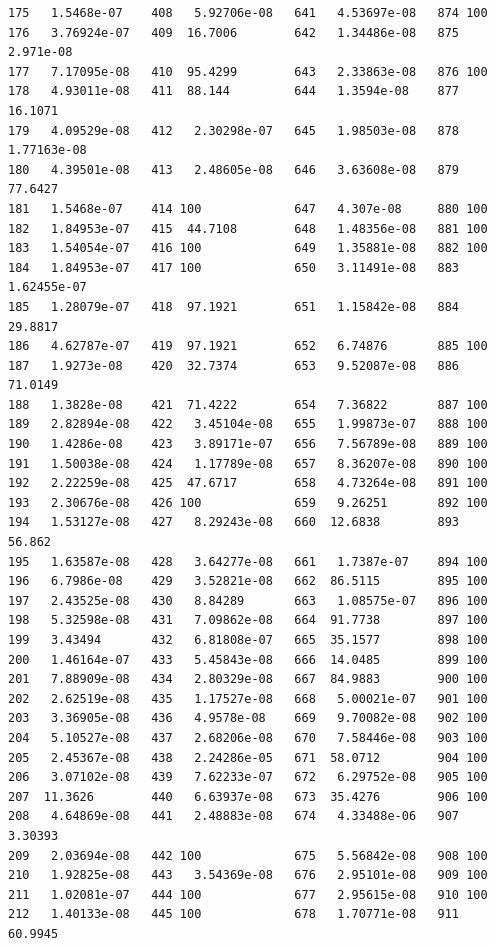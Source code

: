 \documentclass{article}
\begin{document}
\begin{verbatim}
175   1.5468e-07    408   5.92706e-08   641   4.53697e-08   874 100
176   3.76924e-07   409  16.7006        642   1.34486e-08   875   2.971e-08
177   7.17095e-08   410  95.4299        643   2.33863e-08   876 100
178   4.93011e-08   411  88.144         644   1.3594e-08    877  16.1071
179   4.09529e-08   412   2.30298e-07   645   1.98503e-08   878   1.77163e-08
180   4.39501e-08   413   2.48605e-08   646   3.63608e-08   879  77.6427
181   1.5468e-07    414 100             647   4.307e-08     880 100
182   1.84953e-07   415  44.7108        648   1.48356e-08   881 100
183   1.54054e-07   416 100             649   1.35881e-08   882 100
184   1.84953e-07   417 100             650   3.11491e-08   883   1.62455e-07
185   1.28079e-07   418  97.1921        651   1.15842e-08   884  29.8817
186   4.62787e-07   419  97.1921        652   6.74876       885 100
187   1.9273e-08    420  32.7374        653   9.52087e-08   886  71.0149
188   1.3828e-08    421  71.4222        654   7.36822       887 100
189   2.82894e-08   422   3.45104e-08   655   1.99873e-07   888 100
190   1.4286e-08    423   3.89171e-07   656   7.56789e-08   889 100
191   1.50038e-08   424   1.17789e-08   657   8.36207e-08   890 100
192   2.22259e-08   425  47.6717        658   4.73264e-08   891 100
193   2.30676e-08   426 100             659   9.26251       892 100
194   1.53127e-08   427   8.29243e-08   660  12.6838        893  56.862
195   1.63587e-08   428   3.64277e-08   661   1.7387e-07    894 100
196   6.7986e-08    429   3.52821e-08   662  86.5115        895 100
197   2.43525e-08   430   8.84289       663   1.08575e-07   896 100
198   5.32598e-08   431   7.09862e-08   664  91.7738        897 100
199   3.43494       432   6.81808e-07   665  35.1577        898 100
200   1.46164e-07   433   5.45843e-08   666  14.0485        899 100
201   7.88909e-08   434   2.80329e-08   667  84.9883        900 100
202   2.62519e-08   435   1.17527e-08   668   5.00021e-07   901 100
203   3.36905e-08   436   4.9578e-08    669   9.70082e-08   902 100
204   5.10527e-08   437   2.68206e-08   670   7.58446e-08   903 100
205   2.45367e-08   438   2.24286e-05   671  58.0712        904 100
206   3.07102e-08   439   7.62233e-07   672   6.29752e-08   905 100
207  11.3626        440   6.63937e-08   673  35.4276        906 100
208   4.64869e-08   441   2.48883e-08   674   4.33488e-06   907   3.30393
209   2.03694e-08   442 100             675   5.56842e-08   908 100
210   1.92825e-08   443   3.54369e-08   676   2.95101e-08   909 100
211   1.02081e-07   444 100             677   2.95615e-08   910 100
212   1.40133e-08   445 100             678   1.70771e-08   911  60.9945

\end{verbatim}
\end{document}
